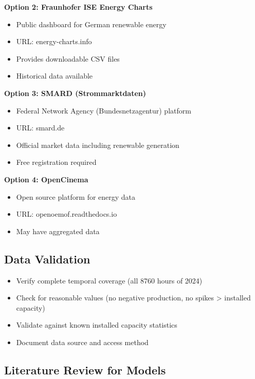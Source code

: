 \documentclass[11pt,a4paper]{article}
\begin{document}
\textbf{Option 2: Fraunhofer ISE Energy Charts}
\begin{itemize}
    \item Public dashboard for German renewable energy
    \item URL: energy-charts.info
    \item Provides downloadable CSV files
    \item Historical data available
\end{itemize}

\textbf{Option 3: SMARD (Strommarktdaten)}
\begin{itemize}
    \item Federal Network Agency (Bundesnetzagentur) platform
    \item URL: smard.de
    \item Official market data including renewable generation
    \item Free registration required
\end{itemize}

\textbf{Option 4: OpenCinema}
\begin{itemize}
    \item Open source platform for energy data
    \item URL: openoemof.readthedocs.io
    \item May have aggregated data
\end{itemize}

\subsection{Data Validation}

\begin{checkbox}
\begin{itemize}
    \item Verify complete temporal coverage (all 8760 hours of 2024)
    \item Check for reasonable values (no negative production, no spikes > installed capacity)
    \item Validate against known installed capacity statistics
    \item Document data source and access method
\end{itemize}
\end{checkbox}

\subsection{Literature Review for Models}
\end{document}

